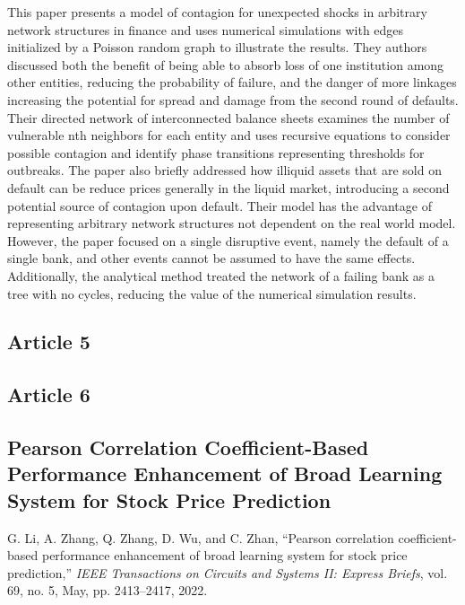 \documentclass[12pt]{article}
\begin{document}
This paper presents a model of contagion for unexpected shocks in arbitrary network structures in finance and uses numerical simulations with edges initialized by a Poisson random graph to illustrate the results. They authors discussed both the benefit of being able to absorb loss of one institution among other entities, reducing the probability of failure, and the danger of more linkages increasing the potential for spread and damage from the second round of defaults. Their directed network of interconnected balance sheets examines the number of vulnerable nth neighbors for each entity and uses recursive equations to consider possible contagion and identify phase transitions representing thresholds for outbreaks. The paper also briefly addressed how illiquid assets that are sold on default can be reduce prices generally in the liquid market, introducing a second potential source of contagion upon default. Their model has the advantage of representing arbitrary network structures not dependent on the real world model. However, the paper focused on a single disruptive event, namely the default of a single bank, and other events cannot be assumed to have the same effects. Additionally, the analytical method treated the network of a failing bank as a tree with no cycles, reducing the value of the numerical simulation results.


\subsection{Article 5}

\subsection{Article 6}



\subsection{Pearson Correlation Coefficient-Based Performance Enhancement of Broad Learning System for Stock Price Prediction}
G. Li, A. Zhang, Q. Zhang, D. Wu, and C. Zhan, “Pearson correlation coefficient-based performance enhancement of broad learning system for stock price prediction,” \textit{IEEE Transactions on Circuits and Systems II: Express Briefs}, vol. 69, no. 5, May, pp. 2413–2417, 2022. %
\newline
\end{document}
